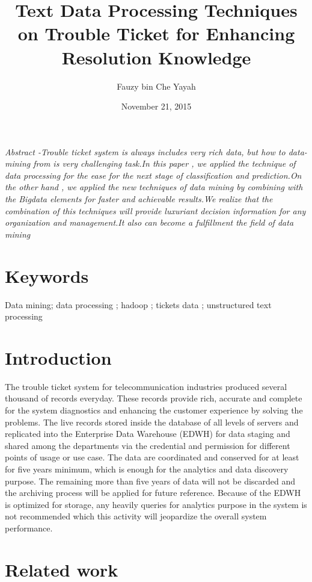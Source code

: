\documentclass[]{article}
\title{Text Data Processing Techniques on Trouble Ticket for Enhancing
Resolution Knowledge}
\author{Fauzy bin Che Yayah}
\date{November 21, 2015}
\begin{document}
\maketitle

{
\hypersetup{linkcolor=black}
\setcounter{tocdepth}{2}
\tableofcontents
}
\pagebreak

\emph{Abstract -Trouble ticket system is always includes very rich data,
but how to data-mining from is very challenging task.In this paper , we
applied the technique of data processing for the ease for the next stage
of classification and prediction.On the other hand , we applied the new
techniques of data mining by combining with the Bigdata elements for
faster and achievable results.We realize that the combination of this
techniques will provide luxuriant decision information for any
organization and management.It also can become a fulfillment the field
of data mining}

\section{Keywords}\label{keywords}

Data mining; data processing ; hadoop ; tickets data ; unstructured text
processing

\section{Introduction}\label{introduction}

The trouble ticket system for telecommunication industries produced
several thousand of records everyday. These records provide rich,
accurate and complete for the system diagnostics and enhancing the
customer experience by solving the problems. The live records stored
inside the database of all levels of servers and replicated into the
Enterprise Data Warehouse (EDWH) for data staging and shared among the
departments via the credential and permission for different points of
usage or use case. The data are coordinated and conserved for at least
for five years minimum, which is enough for the analytics and data
discovery purpose. The remaining more than five years of data will not
be discarded and the archiving process will be applied for future
reference. Because of the EDWH is optimized for storage, any heavily
queries for analytics purpose in the system is not recommended which
this activity will jeopardize the overall system performance.

\section{Related work}\label{related-work}
\end{document}
